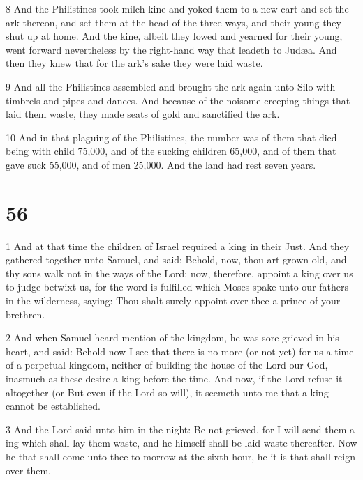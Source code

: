 \par 8 And the Philistines took milch kine and yoked them to a new cart and set the ark thereon, and set them at the head of the three ways, and their young they shut up at home. And the kine, albeit they lowed and yearned for their young, went forward nevertheless by the right-hand way that leadeth to Judæa. And then they knew that for the ark's sake they were laid waste. 

\par 9 And all the Philistines assembled and brought the ark again unto Silo with timbrels and pipes and dances. And because of the noisome creeping things that laid them waste, they made seats of gold and sanctified the ark. 

\par 10 And in that plaguing of the Philistines, the number was of them that died being with child 75,000, and of the sucking children 65,000, and of them that gave suck 55,000, and of men 25,000. And the land had rest seven years.

\chapter{56}

\par 1 And at that time the children of Israel required a king in their Just. And they gathered together unto Samuel, and said: Behold, now, thou art grown old, and thy sons walk not in the ways of the Lord; now, therefore, appoint a king over us to judge betwixt us, for the word is fulfilled which Moses spake unto our fathers in the wilderness, saying: Thou shalt surely appoint over thee a prince of your brethren. 

\par 2 And when Samuel heard mention of the kingdom, he was sore grieved in his heart, and said: Behold now I see that there is no more (or not yet) for us a time of a perpetual kingdom, neither of building the house of the Lord our God, inasmuch as these desire a king before the time. And now, if the Lord refuse it altogether (or But even if the Lord so will), it seemeth unto me that a king cannot be established. 

\par 3 And the Lord said unto him in the night: Be not grieved, for I will send them a ing which shall lay them waste, and he himself shall be laid waste thereafter. Now he that shall come unto thee to-morrow at the sixth hour, he it is that shall reign over them.

